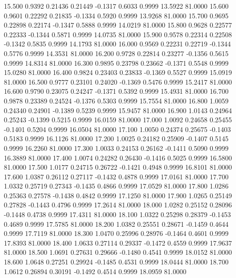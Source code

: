   15.500   0.9392   0.21436   0.21449  -0.1317   0.6033   0.9999  13.5922  81.0000
  15.600   0.9601   0.22292   0.21835  -0.1334   0.5920   0.9999  13.9268  81.0000
  15.700   0.9695   0.22898   0.22174  -0.1347   0.5888   0.9999  14.0219  81.0000
  15.800   0.9628   0.22577   0.22333  -0.1344   0.5871   0.9999  14.0735  81.0000
  15.900   0.9578   0.22314   0.22508  -0.1342   0.5835   0.9999  14.1793  81.0000
  16.000   0.9569   0.22231   0.22719  -0.1344   0.5776   0.9999  14.3531  81.0000
  16.200   0.9728   0.22814   0.23277  -0.1356   0.5615   0.9999  14.8314  81.0000
  16.300   0.9895   0.23798   0.23662  -0.1371   0.5548   0.9999  15.0280  81.0000
  16.400   0.9824   0.23403   0.23833  -0.1369   0.5527   0.9999  15.0919  81.0000
  16.500   0.9777   0.23101   0.24020  -0.1369   0.5476   0.9999  15.2417  81.0000
  16.600   0.9790   0.23075   0.24247  -0.1371   0.5392   0.9999  15.4931  81.0000
  16.700   0.9878   0.23389   0.24524  -0.1376   0.5303   0.9999  15.7554  81.0000
  16.800   1.0059   0.24340   0.24901  -0.1389   0.5239   0.9999  15.9457  81.0000
  16.900   1.0143   0.24964   0.25243  -0.1399   0.5215   0.9999  16.0159  81.0000
  17.000   1.0092   0.24658   0.25455  -0.1401   0.5204   0.9999  16.0504  81.0000
  17.100   1.0050   0.24374   0.25675  -0.1403   0.5183   0.9999  16.1126  81.0000
  17.200   1.0025   0.24182   0.25909  -0.1407   0.5145   0.9999  16.2260  81.0000
  17.300   1.0033   0.24153   0.26162  -0.1411   0.5090   0.9999  16.3889  81.0000
  17.400   1.0074   0.24282   0.26430  -0.1416   0.5025   0.9999  16.5800  81.0000
  17.500   1.0177   0.24715   0.26722  -0.1421   0.4948   0.9999  16.8101  81.0000
  17.600   1.0387   0.26112   0.27117  -0.1432   0.4878   0.9999  17.0161  81.0000
  17.700   1.0332   0.25719   0.27343  -0.1435   0.4866   0.9999  17.0529  81.0000
  17.800   1.0286   0.25363   0.27578  -0.1438   0.4842   0.9999  17.1250  81.0000
  17.900   1.0265   0.25149   0.27828  -0.1443   0.4796   0.9999  17.2614  81.0000
  18.000   1.0282   0.25152   0.28096  -0.1448   0.4738   0.9999  17.4311  81.0000
  18.100   1.0322   0.25298   0.28379  -0.1453   0.4689   0.9999  17.5785  81.0000
  18.200   1.0382   0.25551   0.28671  -0.1459   0.4644   0.9999  17.7119  81.0000
  18.300   1.0470   0.25996   0.28976  -0.1464   0.4601   0.9999  17.8393  81.0000
  18.400   1.0633   0.27114   0.29337  -0.1472   0.4559   0.9999  17.9637  81.0000
  18.500   1.0691   0.27631   0.29666  -0.1480   0.4541   0.9999  18.0152  81.0000
  18.600   1.0648   0.27251   0.29924  -0.1485   0.4531   0.9999  18.0444  81.0000
  18.700   1.0612   0.26894   0.30191  -0.1492   0.4514   0.9999  18.0959  81.0000

